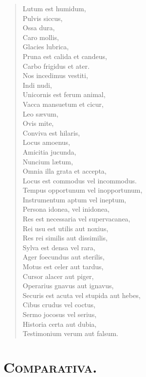 \documentclass[12pt,  postvopaper]{memoir}
\begin{document}
\begin{verse}

  Lutum est humidum,\\
  Pulvis siccus,\\
  Ossa dura,\\
  Caro mollis,\\
  Glacies lubrica,\\
  Pruna est calida et candeus,\\
  Carbo frigidus et ater.\\
  Nos incedimus vestiti,\\
  Indi nudi,\\
  Unicornis est ferum animal,\\
  Vacca mansuetum et cicur,\\
  Leo sævum,\\
  Ovis mite,\\
  Conviva est hilaris,\\
  Locus amoenus,\\
  Amicitia jucunda,\\
  Nuncium lætum,\\
  Omnia illa grata et accepta,\\
  Locus est commodus vel incommodus.\\
  Tempus opportunum vel inopportunum,\\
  Instrumentum aptum vel ineptum,\\
  Persona idonea, vel inidonea,\\
  Res est necessaria vel supervacanea,\\
  Rei usu est utilis aut noxius,\\
  Res rei similis aut dissimilis,\\
  Sylva est densa vel rara,\\
  Ager foecundus aut sterilis,\\
  Motus est celer aut tardus,\\
  Cursor alacer aut piger,\\
  Operarius gnavus aut ignavus,\\
  Securis est acuta vel stupida aut hebes,\\
  Cibus crudus vel coctus,\\
  Sermo jocosus vel serius,\\
  Historia certa aut dubia,\\
  Testimonium verum aut falsum.\\
\end{verse}


\section*{\textsc{Comparativa.}}
\end{document}
